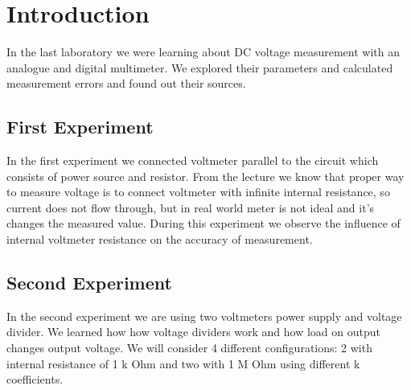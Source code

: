 \section{Introduction}

In the last laboratory we were learning about DC voltage measurement with an analogue and digital multimeter. We explored their parameters and calculated measurement errors and found out their sources. 


\subsection*{First Experiment}

In the first experiment we connected voltmeter parallel to the circuit which consists of power source and resistor. From the lecture we know that proper way to measure voltage is to connect voltmeter with infinite internal resistance, so current does not flow through, but in real world meter is not ideal and it's changes the measured value. During this experiment we observe the influence of internal voltmeter resistance on the accuracy of measurement.
\subsection*{Second Experiment}

In the second experiment we are using two voltmeters power supply and voltage divider. We learned how how voltage dividers work and how load on output changes output voltage. We will consider 4 different configurations: 2 with internal resistance of 1 k Ohm and two with 1 M Ohm using different k coefficients. 




















